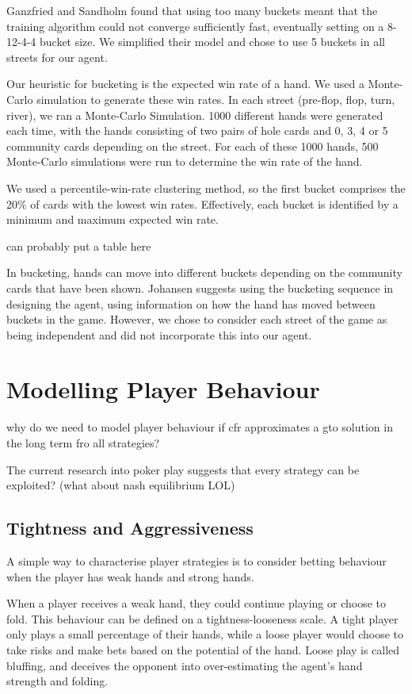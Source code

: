 \documentclass{article}
\begin{document}
Ganzfried and Sandholm found that using too many buckets meant that the training algorithm could not converge sufficiently fast, eventually setting on a 8-12-4-4 bucket size. We simplified their model and chose to use 5 buckets in all streets for our agent.

Our heuristic for bucketing is the expected win rate of a hand. We used a Monte-Carlo simulation to generate these win rates. In each street (pre-flop, flop, turn, river), we ran a Monte-Carlo Simulation. 1000 different hands were generated each time, with the hands consisting of two pairs of hole cards and 0, 3, 4 or 5 community cards depending on the street. For each of these 1000 hands, 500 Monte-Carlo simulations were run to determine the win rate of the hand.

We used a percentile-win-rate clustering method, so the first bucket comprises the 20\% of cards with the lowest win rates. Effectively, each bucket is identified by a minimum and maximum expected win rate.

can probably put a table here

In bucketing, hands can move into different buckets depending on the community cards that have been shown. Johansen suggests using the bucketing sequence in designing the agent, using information on how the hand has moved between buckets in the game. However, we chose to consider each street of the game as being independent and did not incorporate this into our agent.

\section{Modelling Player Behaviour}
why do we need to model player behaviour if cfr approximates a gto solution in the long term fro all strategies? 

The current research into poker play suggests that every strategy can be exploited? (what about nash equilibrium LOL)

\subsection{Tightness and Aggressiveness}
A simple way to characterise player strategies is to consider betting behaviour when the player has weak hands and strong hands. 

When a player receives a weak hand, they could continue playing or choose to fold. This behaviour can be defined on a tightness-looseness scale. A tight player only plays a small percentage of their hands, while a loose player would choose to take risks and make bets based on the potential of the hand. Loose play is called bluffing, and deceives the opponent into over-estimating the agent's hand strength and folding.
\end{document}
